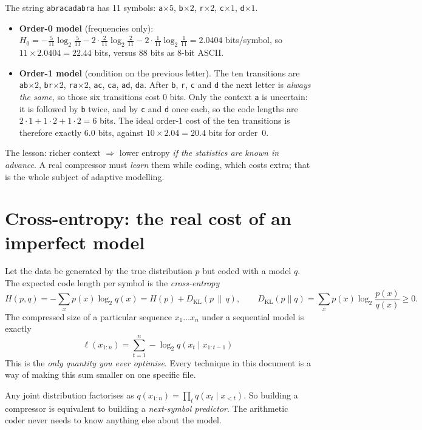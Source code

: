 \documentclass[11pt,a4paper,openany]{book}
\newcommand{\KL}{D_{\mathrm{KL}}}
\theoremstyle{definition}
\theoremstyle{remark}
\begin{document}
\begin{example}
The string \texttt{abracadabra} has 11 symbols: \texttt{a}$\times5$, \texttt{b}$\times2$, \texttt{r}$\times2$, \texttt{c}$\times1$, \texttt{d}$\times1$.
\begin{itemize}
\item \textbf{Order-0 model} (frequencies only): $H_0=-\tfrac{5}{11}\log_2\tfrac5{11}-2\cdot\tfrac2{11}\log_2\tfrac2{11}-2\cdot\tfrac1{11}\log_2\tfrac1{11}=2.0404$ bits/symbol, so $11\times2.0404=22.44$ bits, versus 88 bits as 8-bit ASCII.
\item \textbf{Order-1 model} (condition on the previous letter). The ten transitions are \texttt{ab}$\times2$, \texttt{br}$\times2$, \texttt{ra}$\times2$, \texttt{ac}, \texttt{ca}, \texttt{ad}, \texttt{da}. After \texttt{b}, \texttt{r}, \texttt{c} and \texttt{d} the next letter is \emph{always the same}, so those six transitions cost 0 bits. Only the context \texttt{a} is uncertain: it is followed by \texttt{b} twice, and by \texttt{c} and \texttt{d} once each, so the code lengths are $2\cdot1+1\cdot2+1\cdot2=6$ bits. The ideal order-1 cost of the ten transitions is therefore exactly $6.0$ bits, against $10\times2.04=20.4$ bits for order~0.
\end{itemize}
The lesson: richer context $\Rightarrow$ lower entropy \emph{if the statistics are known in advance}. A real compressor must \emph{learn} them while coding, which costs extra; that is the whole subject of adaptive modelling.
\end{example}

\section{Cross-entropy: the real cost of an imperfect model}

Let the data be generated by the true distribution $p$ but coded with a model $q$. The expected code length per symbol is the \emph{cross-entropy}
\[
H(p,q)=-\sum_x p(x)\log_2 q(x)=H(p)+\KL(p\,\|\,q),\qquad \KL(p\|q)=\sum_x p(x)\log_2\frac{p(x)}{q(x)}\ge0.
\]
The compressed size of a particular sequence $x_1\ldots x_n$ under a sequential model is exactly
\[
\boxed{\;\ell(x_{1:n})=\sum_{t=1}^n -\log_2 q(x_t\mid x_{1:t-1})\;}
\]
This is the \emph{only quantity you ever optimise}. Every technique in this document is a way of making this sum smaller on one specific file.

\begin{example}
Any joint distribution factorises as $q(x_{1:n})=\prod_t q(x_t\mid x_{<t})$. So building a compressor is equivalent to building a \emph{next-symbol predictor}. The arithmetic coder never needs to know anything else about the model.
\end{example}
\end{document}
